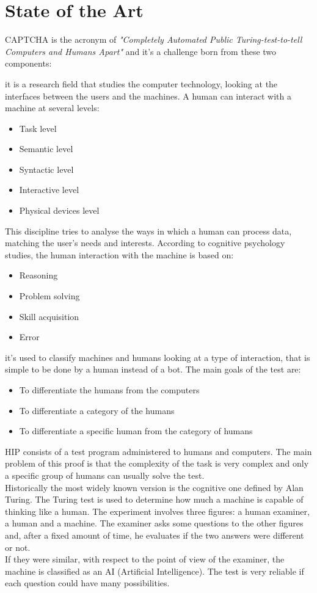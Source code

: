 \chapter{State of the Art}\label{chapter:StateOfArt}
CAPTCHA is the acronym of \textit{"Completely Automated Public Turing-test-to-tell Computers and Humans Apart"} and it's a challenge born from these two components\cite{types_CAPTCHA}:
\begin{enumerate}
{it is a research field that studies the computer technology, looking at the interfaces between the users and the machines. A human can interact with a machine at several levels:
\begin{itemize}
	\item{Task level}
	\item{Semantic level}
	\item{Syntactic level}
	\item{Interactive level}
	\item{Physical devices level}
\end{itemize}
This discipline tries to analyse the ways in which a human can process data, matching the user's needs and interests. According to cognitive psychology studies, the human interaction with the machine is based on:
\begin{itemize}
	\item{Reasoning}
	\item{Problem solving}
	\item{Skill acquisition}
	\item{Error}
\end{itemize}   
}
{it's used to classify machines and humans looking at a type of interaction, that is simple to be done by a human instead of a bot. The main goals of the test are:
\begin{itemize}
	\item{To differentiate the humans from the computers}
	\item{To differentiate a category of the humans}
	\item{To differentiate a specific human from the category of humans}
\end{itemize}
HIP consists of a test program administered to humans and computers. The main problem of this proof is that the complexity of the task is very complex and only a specific group of humans can usually solve the test.\\
Historically the most widely known version is the cognitive one defined by Alan Turing. The Turing test is used to determine how much a machine is capable of thinking like a human. The experiment involves three figures: a human examiner, a human and a machine. The examiner asks some questions to the other figures and, after a fixed amount of time, he evaluates if the two answers were different or not.\\
If they were similar, with respect to the point of view of the examiner, the machine is classified as an AI (Artificial Intelligence). The test is very reliable if each question could have many possibilities.}
\end{enumerate}
